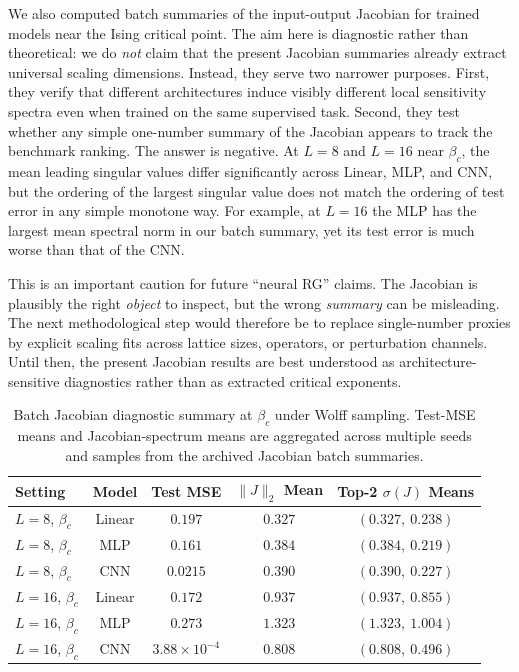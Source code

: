 \documentclass[12pt,a4paper]{memoir}
\begin{document}
We also computed batch summaries of the input-output Jacobian for trained
models near the Ising critical point.  The aim here is diagnostic rather than
theoretical: we do \emph{not} claim that the present Jacobian summaries already
extract universal scaling dimensions.  Instead, they serve two narrower
purposes.  First, they verify that different architectures induce visibly
different local sensitivity spectra even when trained on the same supervised
task.  Second, they test whether any simple one-number summary of the Jacobian
appears to track the benchmark ranking.  The answer is negative.  At $L=8$ and
$L=16$ near $\beta_c$, the mean leading singular values differ significantly
across Linear, MLP, and CNN, but the ordering of the largest singular value does
not match the ordering of test error in any simple monotone way.  For example,
at $L=16$ the MLP has the largest mean spectral norm in our batch summary, yet
its test error is much worse than that of the CNN.

This is an important caution for future ``neural RG'' claims.  The Jacobian is
plausibly the right \emph{object} to inspect, but the wrong \emph{summary} can
be misleading.  The next methodological step would therefore be to replace
single-number proxies by explicit scaling fits across lattice sizes, operators,
or perturbation channels.  Until then, the present Jacobian results are best
understood as architecture-sensitive diagnostics rather than as extracted
critical exponents.

\begin{table}[ht]
    \centering
    \caption{Batch Jacobian diagnostic summary at $\beta_c$ under Wolff sampling.
        Test-MSE means and Jacobian-spectrum means are aggregated across multiple
        seeds and samples from the archived Jacobian batch summaries.}
    \begin{tabular}{lcccc}
        \toprule
        \textbf{Setting} & \textbf{Model} & \textbf{Test MSE} & \textbf{$\|J\|_2$ Mean} & \textbf{Top-2 $\sigma(J)$ Means} \\
        \midrule
        $L=8$, $\beta_c$  & Linear & $0.197$ & $0.327$ & $(0.327,\ 0.238)$ \\
        $L=8$, $\beta_c$  & MLP    & $0.161$ & $0.384$ & $(0.384,\ 0.219)$ \\
        $L=8$, $\beta_c$  & CNN    & $0.0215$ & $0.390$ & $(0.390,\ 0.227)$ \\
        $L=16$, $\beta_c$ & Linear & $0.172$ & $0.937$ & $(0.937,\ 0.855)$ \\
        $L=16$, $\beta_c$ & MLP    & $0.273$ & $1.323$ & $(1.323,\ 1.004)$ \\
        $L=16$, $\beta_c$ & CNN    & $3.88\times10^{-4}$ & $0.808$ & $(0.808,\ 0.496)$ \\
        \bottomrule
    \end{tabular}
    \label{tab:jacobian_diag}
\end{table}
\end{document}
